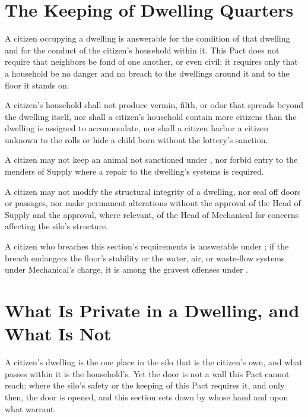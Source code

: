 \section{The Keeping of Dwelling Quarters}
\label{sec:housing:keeping-of-dwelling-quarters}

A citizen occupying a dwelling is answerable for the condition of that dwelling and for the conduct of the citizen's household within it. This Pact does not require that neighbors be fond of one another, or even civil; it requires only that a household be no danger and no breach to the dwellings around it and to the floor it stands on.

\begin{clauses}
\item A citizen's household shall not produce vermin, filth, or odor that spreads beyond the dwelling itself, nor shall a citizen's household contain more citizens than the dwelling is assigned to accommodate, nor shall a citizen harbor a citizen unknown to the rolls or hide a child born without the lottery's sanction.
\item A citizen may not keep an animal not sanctioned under , nor forbid entry to the menders of Supply where a repair to the dwelling's systems is required.
\item A citizen may not modify the structural integrity of a dwelling, nor seal off doors or passages, nor make permanent alterations without the approval of the Head of Supply and the approval, where relevant, of the Head of Mechanical for concerns affecting the silo's structure.
\item A citizen who breaches this section's requirements is answerable under ; if the breach endangers the floor's stability or the water, air, or waste-flow systems under Mechanical's charge, it is among the gravest offenses under .
\end{clauses}

\section{What Is Private in a Dwelling, and What Is Not}
\label{sec:housing:what-is-private-in-a-dwelling}

A citizen's dwelling is the one place in the silo that is the citizen's own, and what passes within it is the household's. Yet the door is not a wall this Pact cannot reach: where the silo's safety or the keeping of this Pact requires it, and only then, the door is opened, and this section sets down by whose hand and upon what warrant.

